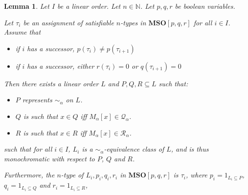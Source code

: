 \documentclass{article}
\newtheorem{lemma}{Lemma}
\newcommand{\mso}{\mathbf{MSO}}
\newcommand{\NN}{\mathbb{N}}
\begin{document}
\begin{lemma}
  Let $I$ be a linear order. Let $n \in \NN$. Let $p, q, r$ be boolean variables.

  Let $\tau_i$ be an assignment of satisfiable $n$-types in $\mso[p, q, r]$ for all $i \in I$. Assume that
  \begin{itemize}
    \item if $i$ has a successor, $p(\tau_i) \ne p(\tau_{i+1})$
    \item if $i$ has a successor, either $r(\tau_i) = 0$ or $q(\tau_{i+1}) = 0$
  \end{itemize}

  Then there exists a linear order $L$ and $P, Q, R \subseteq L$ such that:
  \begin{itemize}
    \item $P$ represents $\sim_{\alpha}$ on $L$.
    \item $Q$ is such that $x \in Q$ iff $M_{\alpha}[x] \in \mathcal{Q}_{\alpha}$.
    \item $R$ is such that $x \in R$ iff $M_{\alpha}[x] \in \mathcal{R}_{\alpha}$.
  \end{itemize}

  such that for all $i \in I$, $L_i$ is a $\sim_{\alpha}$-equivalence class of $L$,
  and is thus monochromatic with respect to $P$, $Q$ and $R$.

  Furthermore, the $n$-type of $L_i, p_i, q_i, r_i$ in $\mso[p, q, r]$ is $\tau_i$, where
  $p_i = 1_{L_i \subseteq P}$, $q_i = 1_{L_i \subseteq Q}$ and $r_i = 1_{L_i \subseteq R}$,
\end{lemma}
\end{document}
